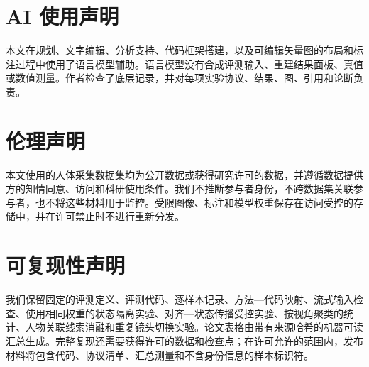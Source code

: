 \section*{AI 使用声明}

本文在规划、文字编辑、分析支持、代码框架搭建，以及可编辑矢量图的布局和标注过程中使用了语言模型辅助。语言模型没有合成评测输入、重建结果面板、真值或数值测量。作者检查了底层记录，并对每项实验协议、结果、图、引用和论断负责。

\section*{伦理声明}

本文使用的人体采集数据集均为公开数据或获得研究许可的数据，并遵循数据提供方的知情同意、访问和科研使用条件。我们不推断参与者身份，不跨数据集关联参与者，也不将这些材料用于监控。受限图像、标注和模型权重保存在访问受控的存储中，并在许可禁止时不进行重新分发。

\section*{可复现性声明}

我们保留固定的评测定义、评测代码、逐样本记录、方法—代码映射、流式输入检查、使用相同权重的状态隔离实验、对齐—状态传播受控实验、按视角聚类的统计、人物关联线索消融和重复镜头切换实验。论文表格由带有来源哈希的机器可读汇总生成。完整复现还需要获得许可的数据和检查点；在许可允许的范围内，发布材料将包含代码、协议清单、汇总测量和不含身份信息的样本标识符。


